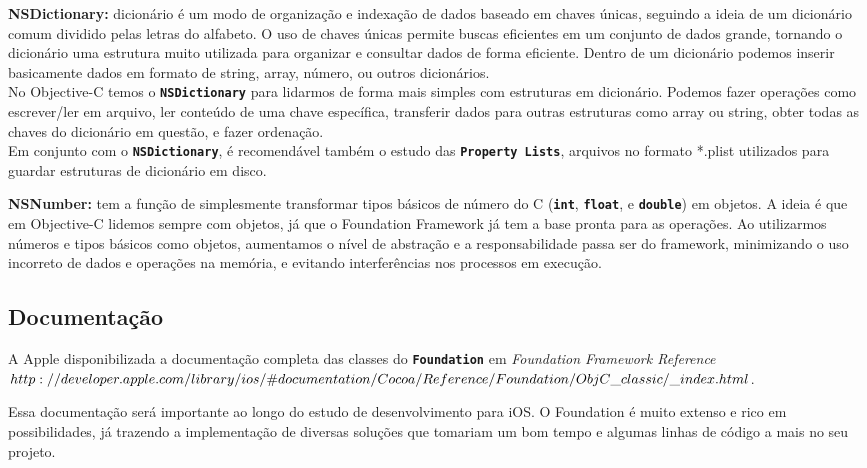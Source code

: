 \documentclass[a4paper,12pt,brazil,doubleside]{book}
\begin{document}
\begin{singlespace}
\begin{description}
\item{\textbf{NSDictionary:} dicionário é um modo de organização e indexação de dados baseado em chaves únicas, seguindo a ideia de um dicionário comum dividido pelas letras do alfabeto. O uso de chaves únicas permite buscas eficientes em um conjunto de dados grande, tornando o dicionário uma estrutura muito utilizada para organizar e consultar dados de forma eficiente. Dentro de um dicionário podemos inserir basicamente dados em formato de string, array, número, ou outros dicionários.\\
No Objective-C temos o \texttt{\textbf{NSDictionary}} para lidarmos de forma mais simples com estruturas em dicionário. Podemos fazer operações como escrever/ler em arquivo, ler conteúdo de uma chave específica, transferir dados para outras estruturas como array ou string, obter todas as chaves do dicionário em questão, e fazer ordenação.\\
Em conjunto com o \texttt{\textbf{NSDictionary}}, é recomendável também o estudo das \texttt{\textbf{Property Lists}}, arquivos no formato *.plist utilizados para guardar estruturas de dicionário em disco.}

\item{\textbf{NSNumber:} tem a função de simplesmente transformar tipos básicos de número do C (\texttt{\textbf{int}}, \texttt{\textbf{float}}, e \texttt{\textbf{double}}) em objetos. A ideia é que em Objective-C lidemos sempre com objetos, já que o Foundation Framework já tem a base pronta para as operações. Ao utilizarmos números e tipos básicos como objetos, aumentamos o nível de abstração e a responsabilidade passa ser do framework, minimizando o uso incorreto de dados e operações na memória, e evitando interferências nos processos em execução.}
\end{description}

\subsection{Documentação}


A Apple disponibilizada a documentação completa das classes do \texttt{\textbf{Foundation}} em
\emph{Foundation Framework Reference\\ \(http://developer.apple.com/library/ios/\#documentation/Cocoa/Reference/\\Foundation/ObjC\_classic/\_index.html\)}.

Essa documentação será importante ao longo do estudo de desenvolvimento para iOS. O Foundation é muito extenso e rico em possibilidades, já trazendo a implementação de diversas soluções que tomariam um bom tempo e algumas linhas de código a mais no seu projeto.


\end{singlespace}
\end{document}

